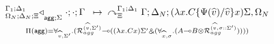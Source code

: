 
\[
\underset{
   \Pi(\m{agg}) = \forall_{\widehat{v}, \Sigma'}.
   (\defstwo{agg}{\widehat{v}}{\Sigma'} \lolli ((\lambda x. C x)\Sigma' \with (\forall_{\widehat{x}, \sigma}.
                                                (A \lolli B \otimes
                                                 \defstwo{agg}{\widehat{v}}{\sigma
                                                 ::\Sigma'}))))
}
{
\trans{
   \contstatea{\Delta_N}{\cdot ; \cdot}{\Gamma}{\Sigma}
}
{
   \derstatex{\Gamma}{\Delta_N}{\Xi}{\Gamma_1}{\Delta_1}{(\lambda x.
         C\{\Psi(\widehat{v})/\widehat{v}\} x) \Sigma,
      \Omega_N}
}
}
\]
